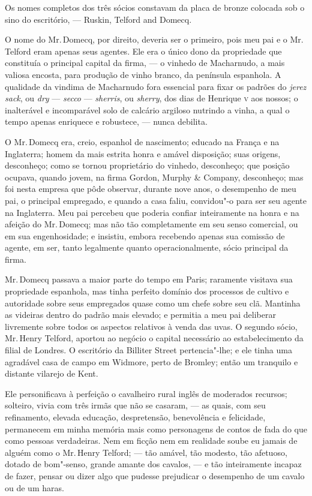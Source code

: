 Os nomes completos dos três sócios constavam da placa de bronze colocada
sob o sino do escritório, --- Ruskin, Telford and Domecq.

O nome do Mr.\,Domecq, por direito, deveria ser o primeiro, pois meu pai e
o Mr.\,Telford eram apenas seus agentes. Ele era o único dono da
propriedade que constituía o principal capital da firma, --- o vinhedo de
Macharnudo, a mais valiosa encosta, para produção de vinho branco, da
península espanhola. A qualidade da vindima de Macharnudo fora essencial
para fixar os padrões do \textit{jerez sack}, ou \textit{dry} --- \textit{secco} --- \textit{sherris}, ou \textit{sherry}, dos dias de Henrique \textsc{v} aos nossos; o inalterável e incomparável solo de calcário argiloso nutrindo a vinha, a qual o tempo apenas enriquece e robustece, --- nunca debilita.

O Mr.\,Domecq era, creio, espanhol de nascimento; educado na França e
na Inglaterra; homem da mais estrita honra e amável disposição; suas
origens, desconheço; como se tornou proprietário do vinhedo, desconheço;
que posição ocupava, quando jovem, na firma Gordon, Murphy \& Company,
desconheço; mas foi nesta empresa que pôde observar, durante nove anos,
o desempenho de meu pai, o principal empregado, e quando a casa faliu,
convidou"-o para ser seu agente na Inglaterra. Meu pai percebeu que
poderia confiar inteiramente na honra e na afeição do Mr.\,Domecq; mas não
tão completamente em seu senso comercial, ou em sua engenhosidade; e
insistiu, embora recebendo apenas sua comissão de agente, em ser, tanto
legalmente quanto operacionalmente, sócio principal da firma.

Mr.\,Domecq passava a maior parte do tempo em Paris; raramente
visitava sua propriedade espanhola, mas tinha perfeito domínio dos
processos de cultivo e autoridade sobre seus empregados quase como um
chefe sobre seu clã. Mantinha as videiras dentro do padrão mais elevado;
e permitia a meu pai deliberar livremente sobre todos os aspectos
relativos à venda das uvas. O segundo sócio, Mr.\,Henry Telford, aportou
ao negócio o capital necessário ao estabelecimento da filial de Londres.
O escritório da Billiter Street pertencia"-lhe; e ele tinha uma agradável
casa de campo em Widmore, perto de Bromley; então um tranquilo e
distante vilarejo de Kent.

Ele personificava à perfeição o cavalheiro rural inglês de moderados
recursos; solteiro, vivia com três irmãs que não se casaram, --- as
quais, com seu refinamento, elevada educação, despretensão, benevolência
e felicidade, permanecem em minha memória mais como personagens de
contos de fada do que como pessoas verdadeiras. Nem em ficção nem em
realidade soube eu jamais de alguém como o Mr.\,Henry Telford; --- tão
amável, tão modesto, tão afetuoso, dotado de bom"-senso, grande amante
dos cavalos, --- e tão inteiramente incapaz de fazer, pensar ou dizer
algo que pudesse prejudicar o desempenho de um cavalo ou de um haras.

